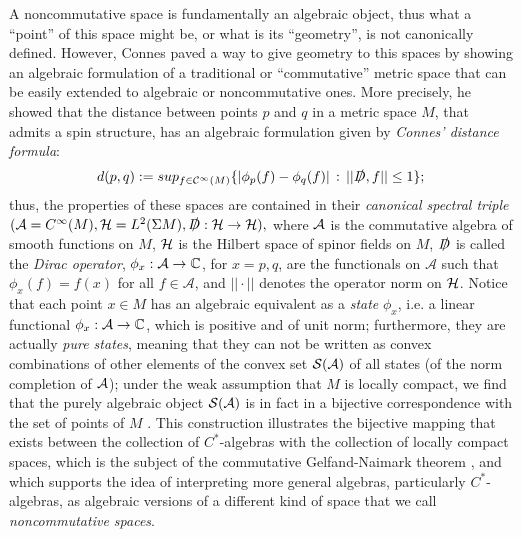 A noncommutative space is fundamentally an algebraic object, thus what a ``point'' of this space might be, or what is its ``geometry'', is not canonically defined. However, Connes \cite{Connes1994} paved a way to give geometry to this spaces by showing an algebraic formulation of a traditional or ``commutative'' metric space that can be easily extended to algebraic or noncommutative ones. More precisely, he showed that the distance between points $p$ and $q$ in a metric space $M$, that admits a spin structure, has an algebraic formulation given by \textit{Connes' distance formula}: 
\begin{equation}\label{ConnesDistanceCommutative}
    d(p, q) := sup_{f \in \mathcal C^\infty(M)}\{ |\phi_p(f) - \phi_q(f)| \,:\,  ||\slashed D, f|| \leq 1 \};
\end{equation}
thus, the properties of these spaces are contained in their \emph{canonical spectral triple} $(\mathcal A = C^\infty(M), \mathcal H = L^2(\Sigma M), \slashed D: \mathcal H \to \mathcal H),$ where $\mathcal A$ is the commutative algebra of smooth functions on $M$, $\mathcal H$ is the Hilbert space of spinor fields on $M$, $\slashed D$ is called the \emph{Dirac operator}, $\phi_x: \acal \to \CC$, for $x = p, q$, are the functionals on $\mathcal A$ such that $\phi_x(f) = f(x)$ for all $f \in \mathcal A$, and $|| \cdot ||$ denotes the operator norm on $\mathcal H$. Notice that each point $x \in M$ has an algebraic equivalent as a \emph{state} $\phi_x$, i.e. a linear functional $\phi_x: \acal \to \CC$, which is positive and of unit norm; furthermore, they are actually \emph{pure states}, meaning that they can not be written as convex combinations of other elements of the convex set $\mathcal S(\mathcal A)$ of all states (of the norm completion of $\mathcal A$); under the weak assumption that $M$ is locally compact, we find that the purely algebraic object $\mathcal S(\mathcal A)$ is in fact in a bijective correspondence with the set of points of $M$ \cite{Varilly2006}. This construction illustrates the bijective mapping that exists between the collection of $C^*$-algebras with the collection of locally compact spaces, which is the subject of the commutative Gelfand-Naimark theorem \cite{Bratteli1987}, and which supports the idea of interpreting more general algebras, particularly $C^*$-algebras, as algebraic versions of a different kind of space that we call \emph{noncommutative spaces}.

